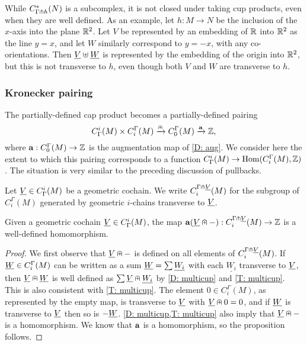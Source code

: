 \begin{remark}
	While $C^*_{\Gamma\pitchfork h}(N)$ is a subcomplex, it is not closed under taking cup products, even when they are well defined.
	As an example, let $h \colon M \to N$ be the inclusion of the $x$-axis into the plane $\mathbb{R}^2$.
	Let $V$ be represented by an embedding of $\mathbb{R}$ into $\mathbb{R}^2$ as the line $y = x$, and let $W$ similarly correspond to $y = -x$, with any co-orientations.
	Then $\underline{V} \uplus \underline{W}$ is represented by the embedding of the origin into $\mathbb{R}^2$, but this is not transverse to $h$, even though both $V$ and $W$ are transverse to $h$.
\end{remark}

\subsubsection{Kronecker pairing}

The partially-defined cap product becomes a partially-defined pairing
$$C^i_\Gamma(M) \times C_i^\Gamma(M) \xrightarrow{\nplus} C_0^\Gamma(M) \xrightarrow{\mathbf{a}}\mathbb{Z},$$
where $\mathbf{a}:C_0^\Gamma(M) \to \mathbb{Z}$ is the augmentation map of \cref{D: aug}.
We consider here the extent to which this pairing corresponds to a function $C^i_\Gamma(M) \to \textup{Hom}(C_i^\Gamma(M),\mathbb{Z})$.
The situation is very similar to the preceding discussion of pullbacks.

\begin{definition}\label{D: transverse to cohain}
	Let $\underline{V} \in C^i_\Gamma(M)$ be a geometric cochain.
	We write $C_i^{\Gamma\pitchfork \underline{V}}(M)$ for the subgroup of $C_i^\Gamma(M)$ generated by geometric $i$-chains transverse to $\underline{V}$.
\end{definition}

\begin{proposition}
	Given a geometric cochain $\underline{V} \in C^i_\Gamma(M)$, the map $\mathbf{a}(\underline{V}\nplus -):C_i^{\Gamma\pitchfork \underline{V}}(M) \to \mathbb{Z}$ is a well-defined homomorphism.
\end{proposition}

\begin{proof}
	We first observe that $\underline{V}\nplus -$ is defined on all elements of $C_i^{\Gamma\pitchfork \underline{V}}(M)$.
	If $\underline{W} \in C_i^\Gamma(M)$ can be written as a sum $\underline{W} = \sum \underline{W_i}$ with each $\underline{W_i}$ transverse to $\underline{V}$, then $\underline{V}\nplus \underline{W}$ is well defined as $\sum \underline{V}\nplus \underline{W_i}$ by \cref{D: multicup} and \cref{T: multicup}.
	This is also consistent with \cref{T: multicup}.
	The element $0 \in C_i^\Gamma(M)$, as represented by the empty map, is transverse to $\underline{V}$ with $\underline{V}\nplus 0 = 0$, and if $\underline{W}$ is transverse to $\underline{V}$ then so is $-\underline{W}$.
	\cref{D: multicup,T: multicup} also imply that $\underline{V} \nplus -$ is a homomorphism.
	We know that $\mathbf{a}$ is a homomorphism, so the proposition follows.
\end{proof}

